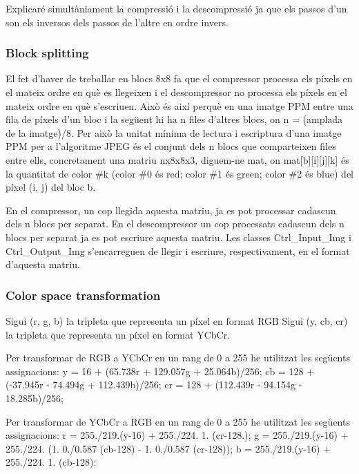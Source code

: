 Explicaré simultàniament la compressió i la descompressió ja que els passos d’un son els inversos dels passos de l’altre en ordre invers.

\subsubsection*{Block splitting}

El fet d’haver de treballar en blocs 8x8 fa que el compressor processa els píxels en el mateix ordre en què es llegeixen i el descompressor no processa els píxels en el mateix ordre en què s’escriuen. Això és així perquè en una imatge P\+PM entre una fila de píxels d’un bloc i la següent hi ha n files d’altres blocs, on n = (amplada de la imatge)/8. Per això la unitat mínima de lectura i escriptura d’una imatge P\+PM per a l’algoritme J\+P\+EG és el conjunt dels n blocs que comparteixen files entre ells, concretament una matriu nx8x8x3, diguem-\/ne mat, on mat\mbox{[}b\mbox{]}\mbox{[}i\mbox{]}\mbox{[}j\mbox{]}\mbox{[}k\mbox{]} és la quantitat de color \#k (color \#0 és red; color \#1 és green; color \#2 és blue) del píxel (i, j) del bloc b.

En el compressor, un cop llegida aquesta matriu, ja es pot processar cadascun dels n blocs per separat. En el descompressor un cop processats cadascun dels n blocs per separat ja es pot escriure aquesta matriu. Les classes Ctrl\+\_\+\+Input\+\_\+\+Img i Ctrl\+\_\+\+Output\+\_\+\+Img s’encarreguen de llegir i escriure, respectivament, en el format d’aquesta matriu.

\subsubsection*{Color space transformation}

Sigui (r, g, b) la tripleta que representa un píxel en format R\+GB Sigui (y, cb, cr) la tripleta que representa un píxel en format Y\+Cb\+Cr.

Per transformar de R\+GB a Y\+Cb\+Cr en un rang de 0 a 255 he utilitzat les següents assignacions\+: y = 16 + (65.\+738r + 129.\+057g + 25.\+064b)/256; cb = 128 + (-\/37.\+945r -\/ 74.\+494g + 112.\+439b)/256; cr = 128 + (112.\+439r -\/ 94.\+154g -\/ 18.\+285b)/256;

Per transformar de Y\+Cb\+Cr a R\+GB en un rang de 0 a 255 he utilitzat les següents assignacions\+: r = 255./219.(y-\/16) + 255./224. 1. (cr-\/128.); g = 255./219.(y-\/16) + 255./224. (1. 0./0.587 (cb-\/128) -\/ 1. 0./0.587 (cr-\/128)); b = 255./219.(y-\/16) + 255./224. 1. (cb-\/128);

